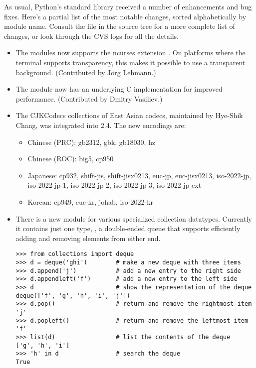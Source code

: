 \documentclass{howto}
\begin{document}
As usual, Python's standard library received a number of enhancements and
bug fixes.  Here's a partial list of the most notable changes, sorted
alphabetically by module name. Consult the
 file in the source tree for a more
complete list of changes, or look through the CVS logs for all the
details.

\begin{itemize}

\item The  modules now supports the ncurses extension 
   .   On platforms where the terminal 
   supports transparency, this makes it possible to use a transparent background.
   (Contributed by J\"org Lehmann.)

\item The  module now has an underlying C implementation
   for improved performance.
   (Contributed by Dmitry Vasiliev.)

\item The CJKCodecs collections of East Asian codecs, maintained
by Hye-Shik Chang, was integrated into 2.4.  
The new encodings are:

\begin{itemize}
 \item Chinese (PRC): gb2312, gbk, gb18030, hz
 \item Chinese (ROC): big5, cp950
 \item Japanese: cp932, shift-jis, shift-jisx0213, euc-jp,
euc-jisx0213, iso-2022-jp, iso-2022-jp-1, iso-2022-jp-2,
 iso-2022-jp-3, iso-2022-jp-ext
 \item Korean: cp949, euc-kr, johab, iso-2022-kr
\end{itemize} 

\item There is a new  module for 
   various specialized collection datatypes.  
   Currently it contains just one type, , 
   a double-ended queue that supports efficiently adding and removing
   elements from either end.

\begin{verbatim}
>>> from collections import deque
>>> d = deque('ghi')        # make a new deque with three items
>>> d.append('j')           # add a new entry to the right side
>>> d.appendleft('f')       # add a new entry to the left side
>>> d                       # show the representation of the deque
deque(['f', 'g', 'h', 'i', 'j'])
>>> d.pop()                 # return and remove the rightmost item
'j'
>>> d.popleft()             # return and remove the leftmost item
'f'
>>> list(d)                 # list the contents of the deque
['g', 'h', 'i']
>>> 'h' in d                # search the deque
True  
\end{verbatim}


\end{itemize}
\end{document}
